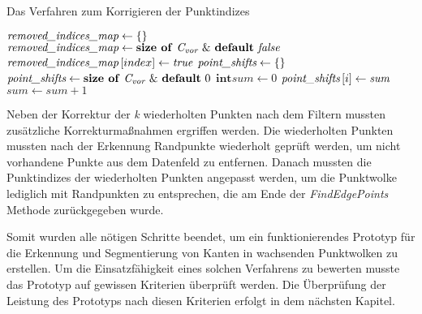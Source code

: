 \begin{algorithm}
	\caption{Das Verfahren zum Korrigieren der Punktindizes}
	\label{alg: mark_points}
	\begin{algorithmic}[1]
		\State $\textit{removed\textunderscore indices\textunderscore map} \gets \text{\{\}}$
		\State $\textit{removed\textunderscore indices\textunderscore map} \gets \text{\textbf{size of} \textit{C\textsubscript{vor}} \& \textbf{default} \textit{false}}$
		\State $\textit{removed\textunderscore indices\textunderscore map} \left[index\right] \gets \textit{true}$
		\EndFor
		\State $\textit{point\textunderscore shifts} \gets \text{\{\}}$
		\State $\textit{point\textunderscore shifts} \gets \text{\textbf{size of} \textit{C\textsubscript{vor}} \& \textbf{default} 0}$
		\State $\textbf{int} \textit{sum} \gets 0$
		\State $\textit{point\textunderscore shifts}\left[i\right] \gets \textit{sum}$
		\Else
		\State $\textit{sum} \gets \textit{sum} + 1$
		\EndIf
		\EndFor
		\EndFunction
	\end{algorithmic}
\end{algorithm}

Neben der Korrektur der \textit{k} wiederholten Punkten nach dem Filtern mussten zusätzliche Korrekturmaßnahmen ergriffen werden. Die wiederholten Punkten mussten nach der Erkennung Randpunkte wiederholt geprüft werden, um nicht vorhandene Punkte aus dem Datenfeld zu entfernen. Danach mussten die Punktindizes der wiederholten Punkten angepasst werden, um die Punktwolke lediglich mit Randpunkten zu entsprechen, die am Ende der \textit{FindEdgePoints} Methode zurückgegeben wurde.

Somit wurden alle nötigen Schritte beendet, um ein funktionierendes Prototyp für die Erkennung und Segmentierung von Kanten in wachsenden Punktwolken zu erstellen. Um die Einsatzfähigkeit eines solchen Verfahrens zu bewerten musste das Prototyp auf gewissen Kriterien überprüft werden. Die Überprüfung der Leistung des Prototyps nach diesen Kriterien erfolgt in dem nächsten Kapitel.